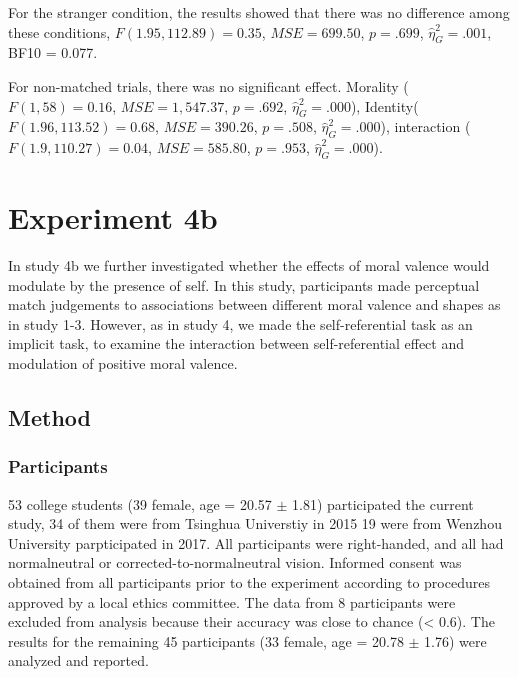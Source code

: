 \documentclass[man]{apa6}
\begin{document}
For the stranger condition, the results showed that there was no difference among these conditions, \(F(1.95, 112.89) = 0.35\), \(\mathit{MSE} = 699.50\), \(p = .699\), \(\hat{\eta}^2_G = .001\), BF10 = 0.077.

For non-matched trials, there was no significant effect. Morality (\(F(1, 58) = 0.16\), \(\mathit{MSE} = 1,547.37\), \(p = .692\), \(\hat{\eta}^2_G = .000\)), Identity(\(F(1.96, 113.52) = 0.68\), \(\mathit{MSE} = 390.26\), \(p = .508\), \(\hat{\eta}^2_G = .000\)), interaction (\(F(1.9, 110.27) = 0.04\), \(\mathit{MSE} = 585.80\), \(p = .953\), \(\hat{\eta}^2_G = .000\)).

\hypertarget{experiment-4b}{%
\section{Experiment 4b}\label{experiment-4b}}

In study 4b we further investigated whether the effects of moral valence would modulate by the presence of self. In this study, participants made perceptual match judgements to associations between different moral valence and shapes as in study 1-3. However, as in study 4, we made the self-referential task as an implicit task, to examine the interaction between self-referential effect and modulation of positive moral valence.

\hypertarget{method-5}{%
\subsection{Method}\label{method-5}}

\hypertarget{participants-7}{%
\subsubsection{Participants}\label{participants-7}}

53 college students (39 female, age = 20.57 \(\pm\) 1.81) participated the current study, 34 of them were from Tsinghua Universtiy in 2015 19 were from Wenzhou University parpticipated in 2017. All participants were right-handed, and all had normalneutral or corrected-to-normalneutral vision. Informed consent was obtained from all participants prior to the experiment according to procedures approved by a local ethics committee. The data from 8 participants were excluded from analysis because their accuracy was close to chance (\textless{} 0.6). The results for the remaining 45 participants (33 female, age = 20.78 \(\pm\) 1.76) were analyzed and reported.
\end{document}
